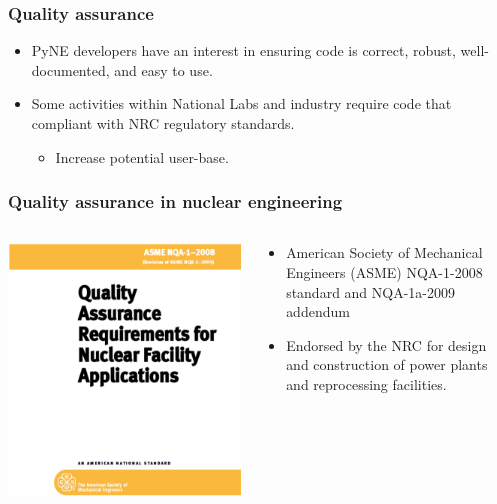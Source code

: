 \documentclass[12pt]{beamer}
\begin{document}
\begin{frame}[fragile]
\frametitle{Quality assurance}

\begin{itemize}
\item{PyNE developers have an interest in ensuring code is correct, robust,
well-documented, and easy to use.}
\item{Some activities within National Labs and industry require code that compliant with NRC regulatory standards.}
\begin{itemize}
\item{Increase potential user-base.}
\end{itemize}
\end{itemize}

\end{frame}
\begin{frame}[fragile]
\frametitle{Quality assurance in nuclear engineering}

\begin{columns}[T]
\begin{column}{0.5\textwidth}
\includegraphics[width=\textwidth]{figures/nqa-1-2008.png}
\end{column}
\begin{column}{0.5\textwidth}
\begin{itemize}
\item{American Society of Mechanical Engineers (ASME)
NQA-1-2008 \cite{nqa} standard and NQA-1a-2009 \cite{add} addendum}
\item{Endorsed by the NRC for design and construction of power plants and reprocessing facilities.}
\end{itemize}
\end{column}
\end{columns}


\end{frame}
\end{document}

